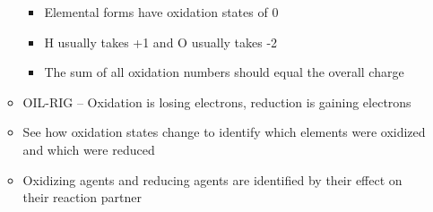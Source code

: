 \documentclass[12pt, letterpaper]{memoir}
\begin{document}
\begin{itemize}
\begin{itemize}
			\begin{itemize}
				\item Elemental forms have oxidation states of 0
				\item H usually takes +1 and O usually takes -2
				\item The sum of all oxidation numbers should equal the overall charge
			\end{itemize}
			\item OIL-RIG -- Oxidation is losing electrons, reduction is gaining electrons
			\item See how oxidation states change to identify which elements were oxidized and which were reduced
			\item Oxidizing agents and reducing agents are identified by their effect on their reaction partner
		\end{itemize}
	\end{itemize}
\end{document}
